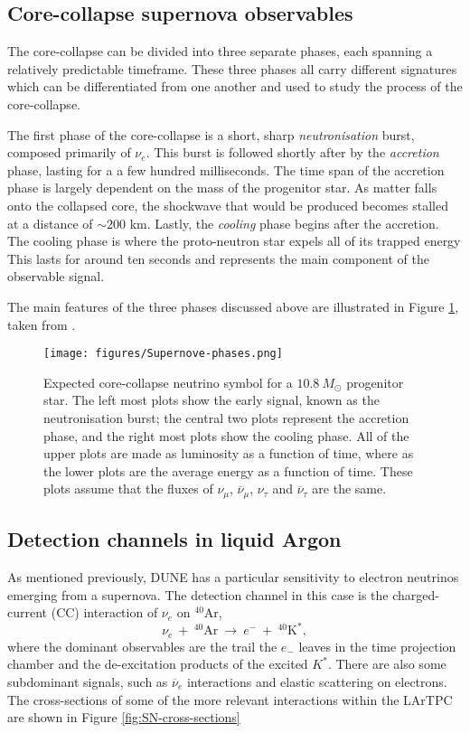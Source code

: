 \subsection{Core-collapse supernova observables}
The core-collapse can be divided into three separate phases, each spanning a relatively predictable timeframe. 
These three phases all carry different signatures which can be differentiated from one another and used to study the process of the core-collapse.

The first phase of the core-collapse is a short, sharp \textit{neutronisation} burst, composed primarily of $\nu_{e}$.
This burst is followed shortly after by the \textit{accretion} phase, lasting for a a few hundred milliseconds. 
The time span of the accretion phase is largely dependent on the mass of the progenitor star.
As matter falls onto the collapsed core, the shockwave that would be produced becomes stalled at a distance of $\sim 200$ km.
Lastly, the \textit{cooling} phase begins after the accretion.
The cooling phase is where the proto-neutron star expels all of its trapped energy
This lasts for around ten seconds and represents the main component of the observable signal.

The main features of the three phases discussed above are illustrated in Figure \ref{fig:core-collapse-phases}, taken from \cite{WURM2012685}.

\begin{figure}[h] %
   \centering
   \texttt{[image: figures/Supernove-phases.png]} 
   \caption{Expected core-collapse neutrino symbol for a $10.8\ M_{\odot}$ progenitor star. The left most plots show the early signal, known as the neutronisation burst; the central two plots represent the accretion phase, and the right most plots show the cooling phase. All of the upper plots are made as luminosity as a function of time, where as the lower plots are the average energy as a function of time. These plots assume that the fluxes of $\nu_{\mu}$, $\overline{\nu}_{\mu}$, $\nu_{\tau}$ and $\overline{\nu}_{\tau}$ are the same.}
   \label{fig:core-collapse-phases}
\end{figure}

\subsection{Detection channels in liquid Argon}
As mentioned previously, DUNE has a particular sensitivity to electron neutrinos emerging from a supernova.
The detection channel in this case is the charged-current (CC) interaction of $\nu_{e}$ on $^{40}$Ar, 
\begin{equation}
\nu_{e}\ +\ ^{40}\textrm{Ar}\ \rightarrow\ e^{-}\ +\ ^{40}\textrm{K}^{*}, 
\end{equation}
\noindent where the dominant observables are the trail the $e_{-}$ leaves in the time projection chamber and the de-excitation products of the excited $K^{*}$.
There are also some subdominant signals, such as $\overline{\nu}_{e}$ interactions and elastic scattering on electrons.
The cross-sections of some of the more relevant interactions within the LArTPC are shown in Figure \ref{fig:SN-cross-sections}

